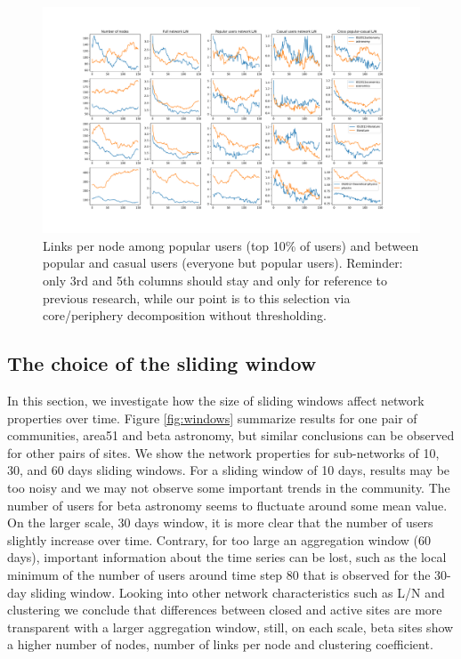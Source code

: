 \clearpage
\begin{figure}[h!]
	\centering
	\includegraphics[width=\linewidth]{Figures/popular_casual_degree_interactions_top10.pdf}
	\caption{Links per node among popular users (top 10\% of users) and between popular and casual users (everyone but popular users).
		Reminder: only 3rd and 5th columns should stay and only for reference to previous research, while our point is to this selection via core/periphery decomposition without thresholding.}
	\label{fig:pop_cas_users}
\end{figure}

\subsection{The choice of the sliding window}

In this section, we investigate how the size of sliding windows affect network properties over time. Figure \ref{fig:windows} summarize results for one pair of communities, area51 and beta astronomy, but similar conclusions can be observed for other pairs of sites. We show the network properties for sub-networks of 10, 30, and 60 days sliding windows. For a sliding window of 10 days, results may be too noisy and we may not observe some important trends in the community. The number of users for beta astronomy seems to fluctuate around some mean value. On the larger scale, 30 days window,  it is more clear that the number of users slightly increase over time. Contrary, for too large an aggregation window (60 days), important information about the time series can be lost, such as the local minimum of the number of users around time step 80 that is observed for the 30-day sliding window. Looking into other network characteristics such as L/N and clustering we conclude that differences between closed and  active sites are more transparent with a larger aggregation window, still, on each scale, beta sites show a higher number of nodes, number of links per node and clustering coefficient.

